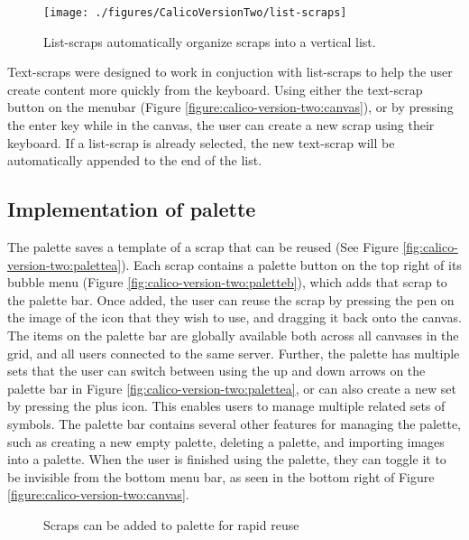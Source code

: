 \documentclass[12pt,fleqn]{ucithesis}
\begin{document}
\begin{figure*}[tbh]
  \centering
  \texttt{[image: ./figures/CalicoVersionTwo/list-scraps]}
  \caption{List-scraps automatically organize scraps into a vertical list.}
  \label{figure:calico-version-two:list-scraps}
\end{figure*}

Text-scraps were designed to work in conjuction with list-scraps to help the user create content more quickly from the keyboard. Using either the text-scrap button on the menubar (Figure \ref{figure:calico-version-two:canvas}), or by pressing the enter key while in the canvas, the user can create a new scrap using their keyboard. If a list-scrap is already selected, the new text-scrap will be automatically appended to the end of the list.

\subsection{Implementation of palette}

The palette saves a template of a scrap that can be reused (See Figure \ref{fig:calico-version-two:palettea}). Each scrap contains a palette button on the top right of its bubble menu (Figure \ref{fig:calico-version-two:paletteb}), which adds that scrap to the palette bar. Once added, the user can reuse the scrap by pressing the pen on the image of the icon that they wish to use, and dragging it back onto the canvas. The items on the palette bar are globally available both across all canvases in the grid, and all users connected to the same server. Further, the palette has multiple sets that the user can switch between using the up and down arrows on the palette bar in Figure \ref{fig:calico-version-two:palettea}, or can also create a new set by pressing the plus icon. This enables users to manage multiple related sets of symbols. The palette bar contains several other features for managing the palette, such as creating a new empty palette, deleting a palette, and importing images into a palette. When the user is finished using the palette, they can toggle it to be invisible from the bottom menu bar, as seen in the bottom right of Figure \ref{figure:calico-version-two:canvas}.

\begin{figure}
  \centering
   \caption {Scraps can be added to palette for rapid reuse}
   \label{fig:calico-version-two:palette}
\end{figure}
\end{document}
